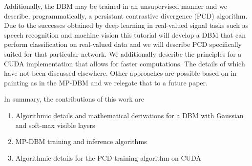 \documentclass{article} %
\begin{document}
Additionally, the DBM may be trained in an unsupervised manner and we describe, programmatically, a persistant contrastive
divergence (PCD) algorithm. Due to the successes obtained by deep learning in real-valued signal
tasks such as speech recognition and machine vision this tutorial will
develop a DBM that can perform classification on real-valued data and we will describe PCD specifically suited for that
particular network.  We additionally describe the principles for a CUDA implementation
that allows for faster computations.  The details of which have not been discussed elsewhere.  Other approaches are possible based on in-painting
as in the MP-DBM and we relegate that to a future paper.

In summary, the contributions of this work are
\begin{enumerate}
\item Algorithmic details and mathematical derivations for a DBM with Gaussian and soft-max visible layers
\item MP-DBM training and inference algorithms
\item Algorithmic details for the PCD training algorithm on CUDA
\end{enumerate}




\end{document}

